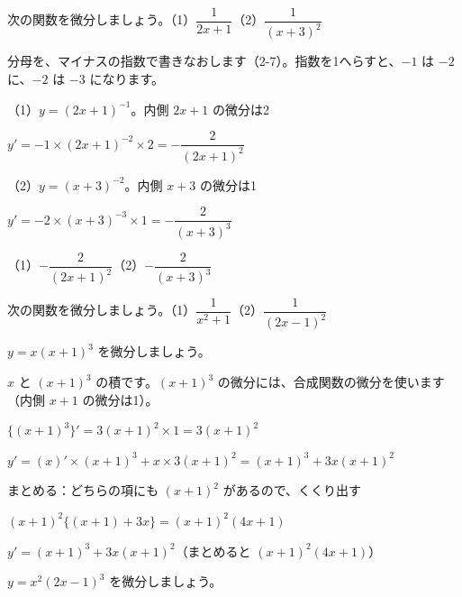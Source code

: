 \begin{reidai}[分数の形]
次の関数を微分しましょう。\quad（1）$\dfrac{1}{2x+1}$\quad（2）$\dfrac{1}{(x+3)^2}$\par
\kangaekata 分母を、マイナスの指数で書きなおします（2-7）。指数を1へらすと、$-1$ は $-2$ に、$-2$ は $-3$ になります。\par
\shiki（1）$y=(2x+1)^{-1}$。内側 $2x+1$ の微分は2\par
\hspace*{4.3\zw}$y'=-1\times(2x+1)^{-2}\times2=-\dfrac{2}{(2x+1)^2}$\par
\hspace*{2.6\zw}（2）$y=(x+3)^{-2}$。内側 $x+3$ の微分は1\par
\hspace*{4.3\zw}$y'=-2\times(x+3)^{-3}\times1=-\dfrac{2}{(x+3)^3}$\par
\kotae （1）$-\dfrac{2}{(2x+1)^2}$\quad（2）$-\dfrac{2}{(x+3)^3}$
\end{reidai}

\begin{jibun}
次の関数を微分しましょう。\quad（1）$\dfrac{1}{x^2+1}$\quad（2）$\dfrac{1}{(2x-1)^2}$
\end{jibun}

\begin{reidai}[積と合成関数の組み合わせ]
$y=x(x+1)^3$ を微分しましょう。\par
\kangaekata $x$ と $(x+1)^3$ の積です。$(x+1)^3$ の微分には、合成関数の微分を使います（内側 $x+1$ の微分は1）。\par
\shiki $\{(x+1)^3\}'=3(x+1)^2\times1=3(x+1)^2$\par
\hspace*{2.6\zw}$y'=(x)'\times(x+1)^3+x\times3(x+1)^2=(x+1)^3+3x(x+1)^2$\par
\hspace*{2.6\zw}まとめる：どちらの項にも $(x+1)^2$ があるので、くくり出す\par
\hspace*{2.6\zw}$(x+1)^2\{(x+1)+3x\}=(x+1)^2(4x+1)$\par
\kotae $y'=(x+1)^3+3x(x+1)^2$\quad（まとめると $(x+1)^2(4x+1)$）
\end{reidai}

\begin{jibun}
$y=x^2(2x-1)^3$ を微分しましょう。
\end{jibun}

